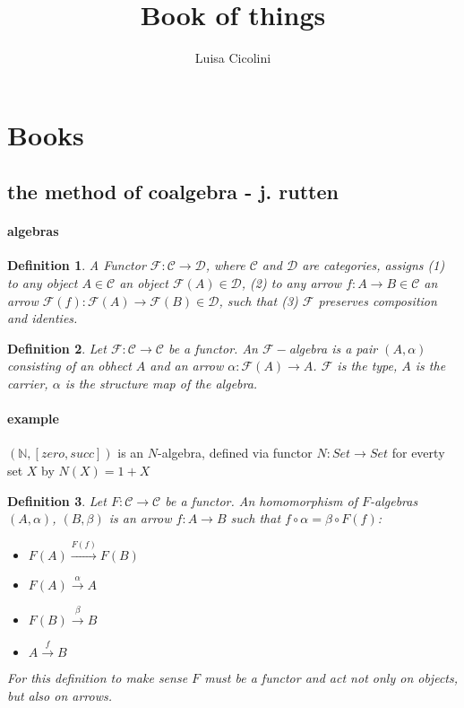 \documentclass[]{article}
\newtheorem{definition}{Definition}
\begin{document}
\title{Book of things}
\author{Luisa Cicolini}
\maketitle 

\section{Books}

\subsection{the method of coalgebra - j. rutten }

\paragraph{algebras}

\begin{definition}
    A Functor $\mathcal{F}: \mathcal{C} \rightarrow \mathcal{D}$, where $\mathcal{C}$ and $\mathcal{D}$ are categories, 
    assigns (1) to any object $A\in \mathcal{C}$ an object $\mathcal{F}(A)\in \mathcal{D}$, (2) to any arrow $f:A\rightarrow B\in \mathcal{C}$ an 
    arrow $\mathcal{F}(f) : \mathcal{F}(A) \rightarrow \mathcal{F}(B) \in \mathcal{D}$, such that (3) $\mathcal{F}$ preserves composition and identies. 
\end{definition}

\begin{definition}
    Let $\mathcal{F}: \mathcal{C} \rightarrow \mathcal{C}$ be a functor. An $\mathcal{F}-$algebra is a pair $(A,\alpha)$ consisting of an obhect $A$ and an arrow 
    $\alpha:\mathcal{F}(A)\rightarrow A$. $\mathcal{F}$ is the type, $A$ is the carrier, $\alpha$ is the structure map of the algebra.
\end{definition}

\paragraph{example} $(\mathbb{N}, [zero, succ])$ is an $N$-algebra, defined via functor $N:Set\rightarrow Set$ for everty set $X$ by $N(X)=1+X$

\begin{definition}
    Let $F: \mathcal{C} \rightarrow \mathcal{C}$ be a functor. 
    An homomorphism of $F$-algebras $(A,\alpha)$, $(B,\beta)$ is an arrow $f:A\rightarrow B$ such that $f\circ \alpha = \beta\circ F(f)$:
    \begin{itemize}
        \item $F(A)\xrightarrow{F(f)}F(B)$
        \item $F(A)\xrightarrow{\alpha}A$
        \item $F(B)\xrightarrow{\beta}B$
        \item $A\xrightarrow{f}B$
    \end{itemize}
    For this definition to make sense $F$ must be a functor and act not only on objects, but also on arrows.
\end{definition}
\end{document}
